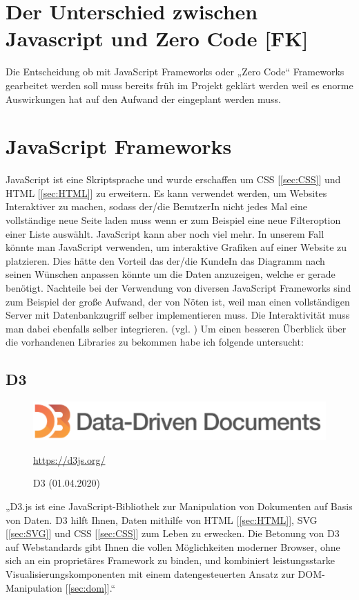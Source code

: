 \section{Der Unterschied zwischen Javascript und Zero Code [FK]}
Die Entscheidung ob mit JavaScript Frameworks oder „Zero Code“ Frameworks gearbeitet werden soll muss bereits früh im Projekt geklärt werden weil es enorme Auswirkungen hat auf den Aufwand der eingeplant werden muss.
\section{JavaScript Frameworks}
JavaScript ist eine Skriptsprache und wurde erschaffen um CSS [\ref{sec:CSS}] und HTML [\ref{sec:HTML}] zu erweitern. Es kann verwendet werden, um Websites Interaktiver zu machen, sodass der/die BenutzerIn nicht jedes Mal eine vollständige neue Seite laden muss wenn er zum Beispiel eine neue Filteroption einer Liste auswählt. JavaScript kann aber noch viel mehr.
In unserem Fall könnte man JavaScript verwenden, um interaktive Grafiken auf einer Website zu platzieren. Dies hätte den Vorteil das der/die KundeIn das Diagramm nach seinen Wünschen anpassen könnte um die Daten anzuzeigen, welche er gerade benötigt. 
Nachteile bei der Verwendung von diversen JavaScript Frameworks sind zum Beispiel der große Aufwand, der von Nöten ist, weil man einen vollständigen Server mit Datenbankzugriff selber implementieren muss. Die Interaktivität muss man dabei ebenfalls selber integrieren. (vgl. \cite{JS})
Um einen besseren Überblick über die vorhandenen Libraries zu bekommen habe ich folgende untersucht: 
\subsection{D3}\label{ssec:D3}
\begin{figure}[H]
    \includegraphics[scale=1]{images/d3logo.PNG}
    \caption{D3 (01.04.2020)}
    \centering
    \url{https://d3js.org/}
\end{figure}
„D3.js ist eine JavaScript-Bibliothek zur Manipulation von Dokumenten auf Basis von Daten. D3 hilft Ihnen, Daten mithilfe von HTML [\ref{sec:HTML}], SVG [\ref{sec:SVG}] und CSS [\ref{sec:CSS}] zum Leben zu erwecken. Die Betonung von D3 auf Webstandards gibt Ihnen die vollen Möglichkeiten moderner Browser, ohne sich an ein proprietäres Framework zu binden, und kombiniert leistungsstarke Visualisierungskomponenten mit einem datengesteuerten Ansatz zur DOM-Manipulation [\ref{sec:dom}].“~\cite{d3.js} 
